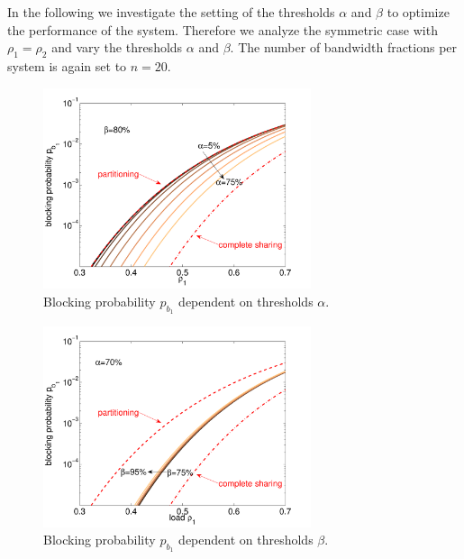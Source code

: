 In the following we investigate the setting of the thresholds $\alpha$ and $\beta$ to optimize the performance of the system.
Therefore we analyze the symmetric case with $\rho_1=\rho_2$ and vary the thresholds $\alpha$ and $\beta$. The number of bandwidth fractions per system is again set to $n=20$.

\begin{figure}[tb]
	\centering
	\includegraphics[width=0.7\textwidth]{aggregation/performance_model/figures/m2_n20_alpha_equal}
 	\caption{Blocking probability $p_{b_1}$ dependent on thresholds $\alpha$.}
 	\label{fig:m2_n20_alpha}
\end{figure}

\begin{figure}[tb]
	\centering
	\includegraphics[width=0.7\textwidth]{aggregation/performance_model/figures/m2_n20_beta_equal}
 	\caption{Blocking probability $p_{b_1}$ dependent on thresholds $\beta$.}
 	\label{fig:m2_n20_beta}
\end{figure}

